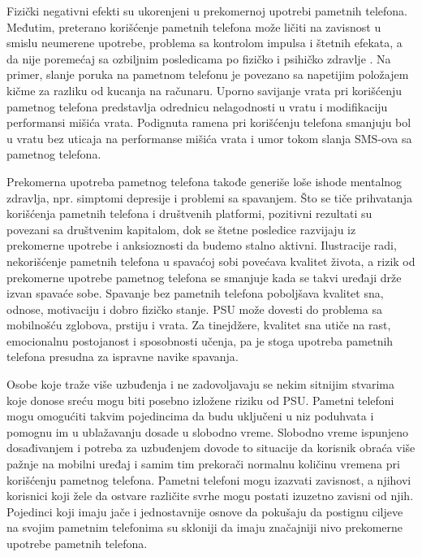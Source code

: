 \documentclass[a4paper]{article}
\begin{document}
Fizički negativni efekti su ukorenjeni u prekomernoj upotrebi
pametnih telefona\cite{consume}. Međutim, preterano korišćenje pametnih telefona
može ličiti na zavisnost u smislu neumerene upotrebe,
problema sa kontrolom impulsa i štetnih efekata,
a da nije poremećaj sa ozbiljnim posledicama po fizičko
i psihičko zdravlje \cite{addiction}. Na primer, slanje poruka na
pametnom telefonu je povezano sa napetijim
položajem kičme za razliku od kucanja na računaru.
Uporno savijanje vrata pri korišćenju pametnog telefona predstavlja odrednicu
nelagodnosti u vratu i modifikaciju performansi mišića vrata.
Podignuta ramena pri korišćenju telefona smanjuju bol u vratu bez uticaja na performanse
mišića vrata i umor tokom slanja SMS-ova sa pametnog telefona\cite{addiction}.


Prekomerna upotreba pametnog telefona takođe generiše loše ishode mentalnog
zdravlja, npr. simptomi depresije i problemi sa spavanjem.
Što se tiče prihvatanja korišćenja pametnih telefona i društvenih platformi,
pozitivni rezultati su povezani sa društvenim kapitalom\cite{consume},
dok se štetne posledice razvijaju iz prekomerne upotrebe 
i anksioznosti da budemo stalno aktivni.
Ilustracije radi, nekorišćenje pametnih telefona u spavaćoj sobi
povećava kvalitet života, a rizik od prekomerne upotrebe pametnog
telefona se smanjuje kada se takvi uređaji drže izvan spavaće sobe.
Spavanje bez pametnih telefona poboljšava kvalitet sna, odnose, motivaciju
i dobro fizičko stanje.
PSU može dovesti do problema sa mobilnošću zglobova, prstiju i vrata.
Za tinejdžere, kvalitet sna utiče na rast,
emocionalnu postojanost i sposobnosti učenja, pa je stoga upotreba
pametnih telefona presudna za ispravne navike spavanja\cite{consume}.


Osobe koje traže više uzbuđenja i ne zadovoljavaju se nekim sitnijim stvarima 
koje donose sreću mogu biti posebno izložene riziku od PSU.
Pametni telefoni mogu omogućiti takvim pojedincima da budu uključeni u niz poduhvata
i pomognu im u ublažavanju dosade u slobodno vreme.
Slobodno vreme ispunjeno dosađivanjem i potreba za uzbuđenjem\cite{ethics}
dovode to situacije da korisnik obraća više pažnje
na mobilni uređaj i samim tim prekorači normalnu količinu vremena pri
korišćenju pametnog telefona.
Pametni telefoni mogu izazvati zavisnost,
a njihovi korisnici koji žele da ostvare različite svrhe mogu postati
izuzetno zavisni od njih.
Pojedinci koji imaju jače i jednostavnije osnove da pokušaju da postignu ciljeve
na svojim pametnim telefonima su skloniji da imaju značajniji
nivo prekomerne upotrebe pametnih telefona\cite{factors}.
\end{document}
